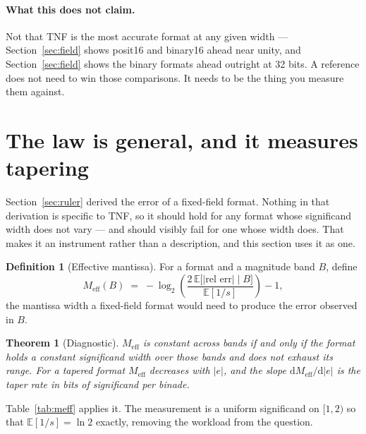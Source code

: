 \documentclass[11pt]{article}
\newtheorem{theorem}{Theorem}
\theoremstyle{definition}
\newtheorem{definition}{Definition}
\begin{document}
\paragraph{What this does not claim.} Not that TNF is the most accurate format
at any given width --- Section~\ref{sec:field} shows posit16 and binary16 ahead
near unity, and Section~\ref{sec:field} shows the binary formats ahead outright at
32 bits. A reference does not need to win those comparisons. It needs to be the
thing you measure them against.


\section{The law is general, and it measures tapering}\label{sec:law}

Section~\ref{sec:ruler} derived the error of a fixed-field format. Nothing in that
derivation is specific to TNF, so it should hold for any format whose significand
width does not vary --- and should visibly fail for one whose width does. That
makes it an instrument rather than a description, and this section uses it as one.

\begin{definition}[Effective mantissa]
For a format and a magnitude band $B$, define
\[
  M_{\mathrm{eff}}(B) \;=\; -\log_2\!\left(\frac{2\,\mathbb{E}\bigl[|\text{rel err}|\;\big|\;B\bigr]}{\mathbb{E}[1/s]}\right) - 1 ,
\]
the mantissa width a fixed-field format would need to produce the error observed
in $B$.
\end{definition}

\begin{theorem}[Diagnostic]\label{thm:diag}
$M_{\mathrm{eff}}$ is constant across bands if and only if the format holds a
constant significand width over those bands and does not exhaust its range. For a
tapered format $M_{\mathrm{eff}}$ decreases with $|e|$, and the slope
$\mathrm{d}M_{\mathrm{eff}}/\mathrm{d}|e|$ is the taper rate in bits of
significand per binade.
\end{theorem}

Table~\ref{tab:meff} applies it. The measurement is a uniform significand on
$[1,2)$ so that $\mathbb{E}[1/s] = \ln 2$ exactly, removing the workload from the
question.
\end{document}

